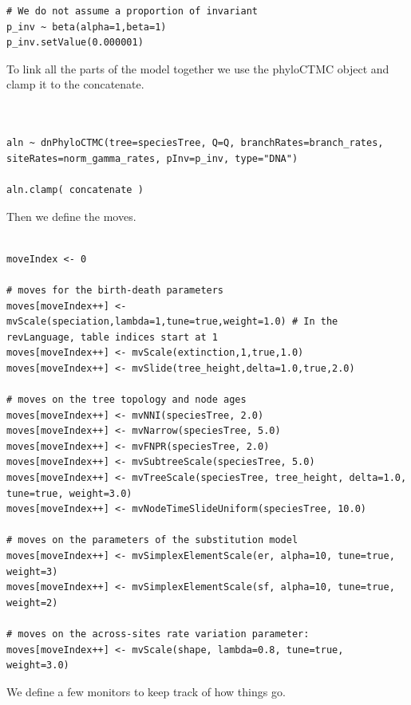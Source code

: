 \documentclass[11pt]{article}
\begin{document}
{\begin{framed}
{\begin{snugshade*}
\begin{lstlisting}
# We do not assume a proportion of invariant
p_inv ~ beta(alpha=1,beta=1)
p_inv.setValue(0.000001)
\end{lstlisting}
\end{snugshade*}}

To link all the parts of the model together we use the phyloCTMC object and clamp it to the concatenate.

 {\tt \begin{snugshade*}
\begin{lstlisting}


aln ~ dnPhyloCTMC(tree=speciesTree, Q=Q, branchRates=branch_rates, siteRates=norm_gamma_rates, pInv=p_inv, type="DNA")

aln.clamp( concatenate )
\end{lstlisting}
\end{snugshade*}}

Then we define the moves.

 {\tt \begin{snugshade*}
\begin{lstlisting}

moveIndex <- 0

# moves for the birth-death parameters
moves[moveIndex++] <- mvScale(speciation,lambda=1,tune=true,weight=1.0) # In the revLanguage, table indices start at 1
moves[moveIndex++] <- mvScale(extinction,1,true,1.0)
moves[moveIndex++] <- mvSlide(tree_height,delta=1.0,true,2.0)

# moves on the tree topology and node ages
moves[moveIndex++] <- mvNNI(speciesTree, 2.0)
moves[moveIndex++] <- mvNarrow(speciesTree, 5.0)
moves[moveIndex++] <- mvFNPR(speciesTree, 2.0)
moves[moveIndex++] <- mvSubtreeScale(speciesTree, 5.0)
moves[moveIndex++] <- mvTreeScale(speciesTree, tree_height, delta=1.0, tune=true, weight=3.0)
moves[moveIndex++] <- mvNodeTimeSlideUniform(speciesTree, 10.0)

# moves on the parameters of the substitution model
moves[moveIndex++] <- mvSimplexElementScale(er, alpha=10, tune=true, weight=3) 
moves[moveIndex++] <- mvSimplexElementScale(sf, alpha=10, tune=true, weight=2) 

# moves on the across-sites rate variation parameter:
moves[moveIndex++] <- mvScale(shape, lambda=0.8, tune=true, weight=3.0)
\end{lstlisting}
\end{snugshade*}}

We define a few monitors to keep track of how things go.
 {\tt \begin{snugshade*}
\begin{lstlisting}


\end{lstlisting}
\end{snugshade*}}
\end{framed}}
\end{document}
